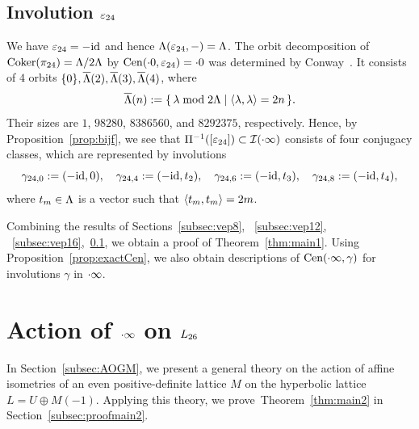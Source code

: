 \documentclass{amsart} %
\begin{document}
\subsection{Involution $\varepsilon_{24}$}\label{subsec:vep24}
%
We have $\varepsilon_{24}=-\mathord{\mathrm{id}}$ and hence $\Lambda(\varepsilon_{24}, -)=\Lambda$.
The orbit decomposition of 
$\operatorname{Coker}(\pi_{24})=\Lambda/2\Lambda$ by $\mathrm{Cen}(\cdot 0, \varepsilon_{24})=\cdot 0$ 
was determined by  
Conway~\cite[Chapter 10, Section 3.3]{theCSbook}.
It consists of $4$ orbits $\{0\}, \overline{\Lambda}(2), \overline{\Lambda}(3), \overline{\Lambda}(4)$, where 
\[
 \overline{\Lambda}(n):=\{\,{\lambda\bmod 2\Lambda}\mid {\langle \lambda, \lambda \rangle=2n} \,\}.
\]
Their sizes are $1$, $98280$, $8386560$, and $8292375$, respectively.
Hence, by Proposition~\ref{prop:bijf}, we see that 
$\Pi^{-1} ([\varepsilon_{24}])\subset \mathord{\mathcal{I}}(\cdot \infty)$ consists of four conjugacy classes,
 which are 
 represented by involutions
 \[
\gamma_{24, 0}:=(-\mathord{\mathrm{id}}, 0),
\quad
\gamma_{24, 4}:=(-\mathord{\mathrm{id}}, t_2),
\quad
\gamma_{24, 6}:=(-\mathord{\mathrm{id}}, t_3),
\quad
\gamma_{24, 8}:=(-\mathord{\mathrm{id}}, t_4),
 \]
where $t_m\in \Lambda$ is a vector such that
$\langle  t_m, t_m \rangle=2m$.
%
\par
\medskip
Combining the results of Sections~\ref{subsec:vep8}, ~\ref{subsec:vep12}, ~\ref{subsec:vep16},~\ref{subsec:vep24},
we obtain a proof of Theorem~\ref{thm:main1}.
Using Proposition~\ref{prop:exactCen}, we also obtain descriptions of $\mathrm{Cen}(\cdot \infty, \gamma)$
for involutions $\gamma$ in $\cdot \infty$.
%
%
\section{Action of $\cdot \infty$ on $L_{26}$}\label{sec:proofThm2}
%
In Section~\ref{subsec:AOGM}, 
we present a general theory on the action of affine isometries of an even positive-definite lattice $M$
on the hyperbolic lattice $L=U\oplus M(-1)$.
Applying this theory,
we  prove~Theorem~\ref{thm:main2} in Section~\ref{subsec:proofmain2}.
%
%
\end{document}
